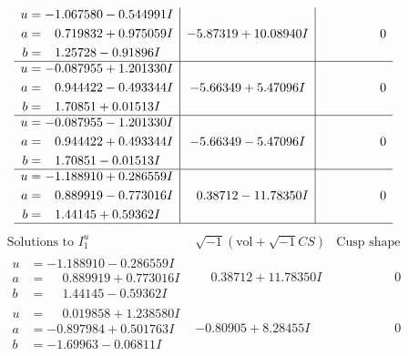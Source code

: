 \documentclass[1p]{elsarticle_modified}
\theoremstyle{definition}
\newcommand{\I}{\sqrt{-1}}
\begin{document}
$$\begin{array}{c|c|c}
\begin{aligned}
u &= -1.067580 - 0.544991 I \\
a &= \phantom{-}0.719832 + 0.975059 I \\
b &= \phantom{-}1.25728 - 0.91896 I\end{aligned}
 & -5.87319 + 10.08940 I & \phantom{-0.000000 } 0 \\ \hline\begin{aligned}
u &= -0.087955 + 1.201330 I \\
a &= \phantom{-}0.944422 - 0.493344 I \\
b &= \phantom{-}1.70851 + 0.01513 I\end{aligned}
 & -5.66349 + 5.47096 I & \phantom{-0.000000 } 0 \\ \hline\begin{aligned}
u &= -0.087955 - 1.201330 I \\
a &= \phantom{-}0.944422 + 0.493344 I \\
b &= \phantom{-}1.70851 - 0.01513 I\end{aligned}
 & -5.66349 - 5.47096 I & \phantom{-0.000000 } 0 \\ \hline\begin{aligned}
u &= -1.188910 + 0.286559 I \\
a &= \phantom{-}0.889919 - 0.773016 I \\
b &= \phantom{-}1.44145 + 0.59362 I\end{aligned}
 & \phantom{-}0.38712 - 11.78350 I & \phantom{-0.000000 } 0\\
 \hline 
 \end{array}$$\newpage$$\begin{array}{c|c|c}  
\text{Solutions to }I^u_{1}& \I (\text{vol} + \sqrt{-1}CS) & \text{Cusp shape}\\
 \hline 
\begin{aligned}
u &= -1.188910 - 0.286559 I \\
a &= \phantom{-}0.889919 + 0.773016 I \\
b &= \phantom{-}1.44145 - 0.59362 I\end{aligned}
 & \phantom{-}0.38712 + 11.78350 I & \phantom{-0.000000 } 0 \\ \hline\begin{aligned}
u &= \phantom{-}0.019858 + 1.238580 I \\
a &= -0.897984 + 0.501763 I \\
b &= -1.69963 - 0.06811 I\end{aligned}
 & -0.80905 + 8.28455 I & \phantom{-0.000000 } 0 \\ \hline\begin{aligned}

\end{aligned}
\end{array}$$
\end{document}
